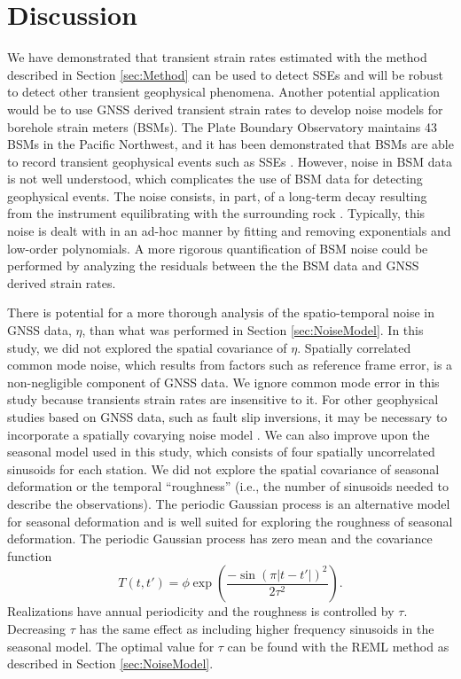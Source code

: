 \documentclass[extra,mreferee]{gji}
\begin{document}
\section{Discussion}\label{sec:Discussion}
We have demonstrated that transient strain rates estimated with the method described in Section \ref{sec:Method} can be used to detect SSEs and will be robust to detect other transient geophysical phenomena. Another potential application would be to use GNSS derived transient strain rates to develop noise models for borehole strain meters (BSMs). The Plate Boundary Observatory maintains 43 BSMs in the Pacific Northwest, and it has been demonstrated that BSMs are able to record transient geophysical events such as SSEs \citep[e.g.,][]{Dragert2011}. However, noise in BSM data is not well understood, which complicates the use of BSM data for detecting geophysical events. The noise consists, in part, of a long-term decay resulting from the instrument equilibrating with the surrounding rock \citep{Gladwin1987}. Typically, this noise is dealt with in an ad-hoc manner by fitting and removing exponentials and low-order polynomials. A more rigorous quantification of BSM noise could be performed by analyzing the residuals between the the BSM data and GNSS derived strain rates.    

There is potential for a more thorough analysis of the spatio-temporal noise in GNSS data, $\eta$, than what was performed in Section \ref{sec:NoiseModel}. In this study, we did not explored the spatial covariance of $\eta$. Spatially correlated common mode noise, which results from factors such as reference frame error, is a non-negligible component of GNSS data. We ignore common mode error in this study because transients strain rates are insensitive to it. For other geophysical studies based on GNSS data, such as fault slip inversions, it may be necessary to incorporate a spatially covarying noise model \citep[e.g.,][]{Miyazaki2003}. We can also improve upon the seasonal model used in this study, which consists of four spatially uncorrelated sinusoids for each station. We did not explore the spatial covariance of seasonal deformation or the temporal ``roughness'' (i.e., the number of sinusoids needed to describe the observations). The periodic Gaussian process \citep{Mackay1998} is an alternative model for seasonal deformation and is well suited for exploring the roughness of seasonal deformation.  The periodic Gaussian process has zero mean and the covariance function
\begin{equation}\label{eq:Periodic}
T(t,t') = \phi \exp\left(\frac{-\sin(\pi|t - t'|)^2}{2\tau^2}\right).
\end{equation}
Realizations have annual periodicity and the roughness is controlled by $\tau$. Decreasing $\tau$ has the same effect as including higher frequency sinusoids in the seasonal model. The optimal value for $\tau$ can be found with the REML method as described in Section \ref{sec:NoiseModel}. 
\end{document}
